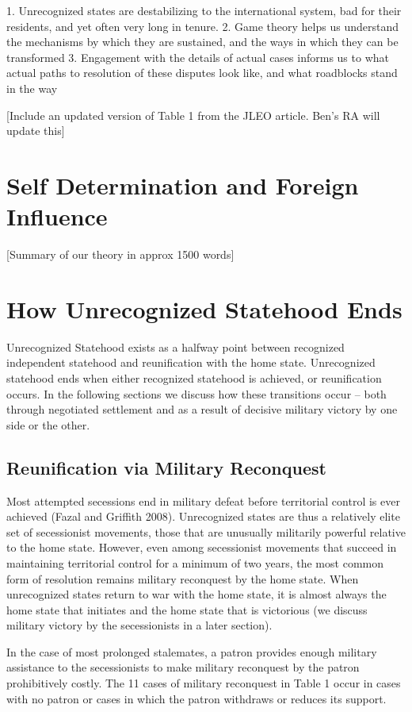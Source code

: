 \documentclass[12pt,letterpaper, notitlepage]{article}
\begin{document}
1. Unrecognized states are destabilizing to the international system, bad for their residents, and yet often very long in tenure.
2. Game theory helps us understand the mechanisms by which they are sustained, and the ways in which they can be transformed
3. Engagement with the details of actual cases informs us to what actual paths to resolution of these disputes look like, and what roadblocks stand in the way


[Include an updated version of Table 1 from the JLEO article. Ben's RA will update this]


\section*{Self Determination and Foreign Influence}
[Summary of our theory in approx 1500 words]

\section*{How Unrecognized Statehood Ends}

Unrecognized Statehood exists as a halfway point between recognized independent statehood and reunification with the home state. Unrecognized statehood ends when either recognized statehood is achieved, or reunification occurs.  In the following sections we discuss how these transitions occur -- both through negotiated settlement and as a result of decisive military victory by one side or the other.  

\subsection*{Reunification via Military Reconquest}

Most attempted secessions end in military defeat before territorial control is ever achieved (Fazal and Griffith 2008). Unrecognized states are thus a relatively elite set of secessionist movements, those that are unusually militarily powerful relative to the home state. However, even among secessionist movements that succeed in maintaining territorial control for a minimum of two years, the most common form of resolution remains military reconquest by the home state. When unrecognized states return to war with the home state, it is almost always the home state that initiates and the home state that is victorious (we discuss military victory by the secessionists in a later section).

In the case of most prolonged stalemates, a patron provides enough military assistance to the secessionists to make military reconquest by the patron prohibitively costly.  The 11 cases of military reconquest in Table 1 occur in cases with no patron or cases in which the patron withdraws or reduces its support.  
\end{document}
